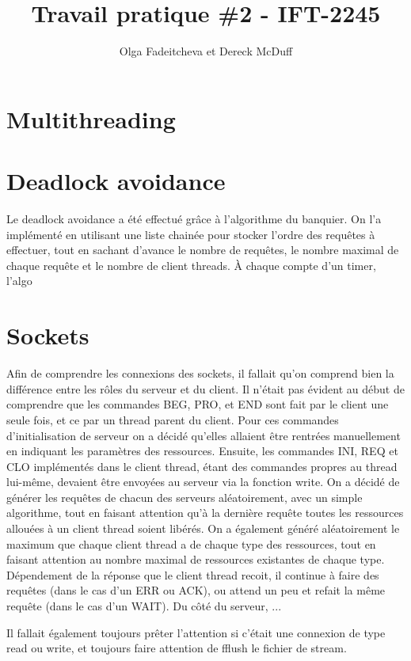 \documentclass[11pt]{article}
\title{Travail pratique \#2 - IFT-2245}
\author{Olga Fadeitcheva et Dereck McDuff}
\begin{document}
\maketitle

\section{Multithreading}

\section{Deadlock avoidance}

Le deadlock avoidance a été effectué grâce à l'algorithme du banquier. On l'a implémenté en utilisant une liste chainée pour stocker l'ordre des requêtes à effectuer, tout en sachant d'avance le nombre de requêtes, le nombre maximal de chaque requête et le nombre de client threads. À chaque compte d'un timer, l'algo

\section{Sockets}
	Afin de comprendre les connexions des sockets, il fallait qu'on comprend bien la différence entre les rôles du serveur et du client. Il n'était pas évident au début de comprendre que les commandes BEG, PRO, et END sont fait par le client une seule fois, et ce par un thread parent du client. Pour ces commandes d'initialisation de serveur on a décidé qu'elles allaient être rentrées manuellement en indiquant les paramètres des ressources. Ensuite, les commandes INI, REQ et CLO implémentés dans le client thread, étant des commandes propres au thread lui-même, devaient être envoyées au serveur via la fonction write. On a décidé de générer les requêtes de chacun des serveurs aléatoirement, avec un simple algorithme, tout en faisant attention qu'à la dernière requête toutes les ressources allouées à un client thread soient libérés. On a également généré aléatoirement le maximum que chaque client thread a de chaque type des ressources, tout en faisant attention au nombre maximal de ressources existantes de chaque type. Dépendement de la réponse que le client thread recoit, il continue à faire des requêtes (dans le cas d'un ERR ou ACK), ou attend un peu et refait la même requête (dans le cas d'un WAIT).
	Du côté du serveur, ...
	
	Il fallait également toujours prêter l'attention si c'était une connexion de type read ou write, et toujours faire attention de fflush le fichier de stream.
\end{document}
